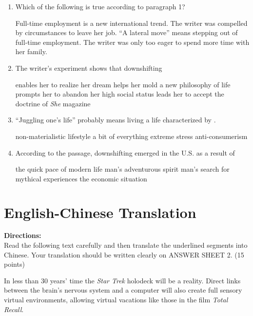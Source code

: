 \begin{enumerate}[resume]
	\item
Which of the following is true according to paragraph 1?


\fourchoices
{Full-time employment is a new international trend.}
{The writer was compelled by circumstances to leave her job.}
{``A lateral move'' means stepping out of full-time employment.}
{The writer was only too eager to spend more time with her family.}



\item
The writer's experiment shows that downshifting \lineread


\fourchoices
{enables her to realize her dream}
{helps her mold a new philosophy of life}
{prompts her to abandon her high social status}
{leads her to accept the doctrine of \emph{She} magazine}


\item
``Juggling one's life'' probably means living a life characterized
by \lineread.


\fourchoices
{non-materialistic lifestyle}
{a bit of everything}
{extreme stress}
{anti-consumerism}


\item
According to the passage, downshifting emerged in the U.S. as a
result of \lineread


\fourchoices
{the quick pace of modern life}
{man's adventurous spirit}
{man's search for mythical experiences}
{the economic situation}

	
\end{enumerate}


\newpage
\section{ English-Chinese Translation}

\noindent
\textbf{Directions:}\\
Read the following text carefully and then translate the
underlined segments into Chinese. Your translation should be written
clearly on ANSWER SHEET 2. (15 points)

\TiGanSpace

In less than 30 years' time the \emph{Star Trek} holodeck will be a reality.
Direct links between the brain's nervous system and a computer will also
create full sensory virtual environments, allowing virtual vacations
like those in the film \emph{Total Recall}.



